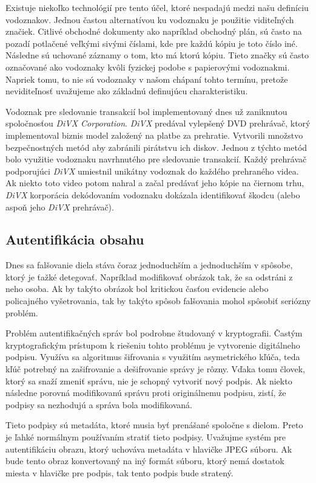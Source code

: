 Existuje niekoľko technológií pre tento účel, ktoré nespadajú medzi našu definíciu vodoznakov. Jednou častou alternatívou ku vodoznaku je použitie viditeľných značiek. Citlivé obchodné dokumenty ako napríklad obchodný plán, sú často na pozadí potlačené veľkými sivými číslami, kde pre každú kópiu je toto číslo iné. Následne sú uchované záznamy o tom, kto má ktorú kópiu. Tieto značky sú často označované ako vodoznaky kvôli fyzickej podobe s papierovými vodoznakmi. Napriek tomu, to nie sú vodoznaky v našom chápaní tohto termínu, pretože neviditeľnosť uvažujeme ako základnú definujúcu charakteristiku.

Vodoznak pre sledovanie transakcií bol implementovaný dnes už zaniknutou spoločnosťou {\it DiVX Corporation}. {\it DiVX} predával vylepšený DVD prehrávač, ktorý implementoval biznis model založený na platbe za prehratie. Vytvorili množstvo bezpečnostných metód aby zabránili pirátstvu ich diskov. Jednou z týchto metód bolo využitie vodoznaku navrhnutého pre sledovanie transakcií. Každý prehrávač podporujúci {\it DiVX} umiestnil unikátny vodoznak do každého prehraného videa. Ak niekto toto video potom nahral a začal predávať jeho kópie na čiernom trhu, {\it DiVX} korporácia dekódovaním vodoznaku dokázala identifikovať škodcu (alebo aspoň jeho {\it DiVX} prehrávač). \cite{Cox}

\subsection{Autentifikácia obsahu}
Dnes sa falšovanie diela stáva čoraz jednoduchším a jednoduchším v spôsobe, ktorý je ťažké detegovať. Napríklad modifikovať obrázok tak, že sa odstráni z neho osoba. Ak by takýto obrázok bol kritickou časťou evidencie alebo policajného vyšetrovania, tak by takýto spôsob falšovania mohol spôsobiť seriózny problém.

Problém autentifikačných správ bol podrobne študovaný v kryptografii. Častým kryptografickým prístupom k riešeniu tohto problému je vytvorenie digitálneho podpisu. Využíva sa algoritmus šifrovania s využitím asymetrického kľúča, teda kľúč potrebný na zašifrovanie a dešifrovanie správy je rôzny. Vďaka tomu človek, ktorý sa snaží zmeniť správu, nie je schopný vytvoriť nový podpis. Ak niekto následne porovná modifikovanú správu proti originálnemu podpisu, zistí, že podpisy sa nezhodujú a správa bola modifikovaná.

Tieto podpisy sú metadáta, ktoré musia byť prenášané spoločne s dielom. Preto je ľahké normálnym používaním stratiť tieto podpisy. Uvažujme systém pre autentifikáciu obrazu, ktorý uchováva metadáta v hlavičke JPEG súboru. Ak bude tento obraz konvertovaný na iný formát súboru, ktorý nemá dostatok miesta v hlavičke pre podpis, tak tento podpis bude stratený.


